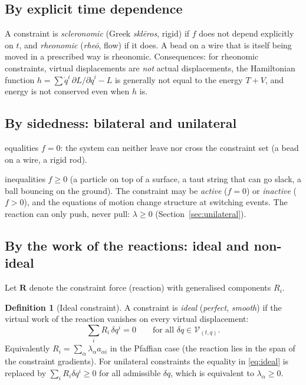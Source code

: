 \documentclass[11pt,a4paper]{article}
\theoremstyle{definition}
\newtheorem{definition}{Definition}[section]
\theoremstyle{plain}
\theoremstyle{remark}
\begin{document}
\subsection{By explicit time dependence}
A constraint is \emph{scleronomic} (Greek \emph{skl\=eros}, rigid) if $f$ does not depend explicitly on $t$,
and \emph{rheonomic} (\emph{rhe\=o}, flow) if it does. A bead on a wire that is itself being
moved in a prescribed way is rheonomic. Consequences: for rheonomic constraints, virtual
displacements are \emph{not} actual displacements, the Hamiltonian function
$h=\sum\dot q^i\,\partial L/\partial\dot q^i-L$ is generally not equal to the energy
$T+V$, and energy is not conserved even when $h$ is.

\subsection{By sidedness: bilateral and unilateral}
\begin{description}[leftmargin=1.2em,style=nextline]
\item[Bilateral (two-sided, retaining)] equalities $f=0$: the system can neither leave nor
  cross the constraint set (a bead on a wire, a rigid rod).
\item[Unilateral (one-sided, non-retaining)] inequalities $f\ge0$ (a particle on top of a
  surface, a taut string that can go slack, a ball bouncing on the ground). The constraint
  may be \emph{active} ($f=0$) or \emph{inactive} ($f>0$), and the equations of motion
  change structure at switching events. The reaction can only push, never pull:
  $\lambda\ge0$ (Section~\ref{sec:unilateral}).
\end{description}

\subsection{By the work of the reactions: ideal and non-ideal}\label{sec:ideal}
Let $\mathbf R$ denote the constraint force (reaction) with generalised components
$R_i$.

\begin{definition}[Ideal constraint]
A constraint is \emph{ideal} (\emph{perfect}, \emph{smooth}) if the virtual work of the
reaction vanishes on every virtual displacement:
\begin{equation}\label{eq:ideal}
  \sum_i R_i\,\delta q^i=0\qquad\text{for all }\delta q\in\mathcal V_{(t,q)}.
\end{equation}
Equivalently $R_i=\sum_\alpha\lambda_\alpha a_{\alpha i}$ in the Pfaffian case (the reaction
lies in the span of the constraint gradients). For unilateral constraints the
equality in \eqref{eq:ideal} is replaced by $\sum_iR_i\delta q^i\ge0$ for all admissible
$\delta q$, which is equivalent to $\lambda_\alpha\ge0$.
\end{definition}
\end{document}
